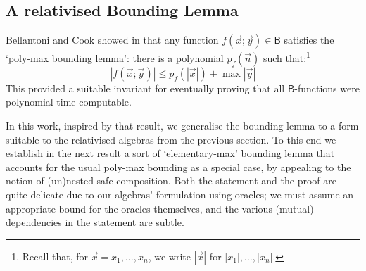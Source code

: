 \documentclass[manuscript,screen]{acmart}
\theoremstyle{definition}
\theoremstyle{remark}
\newcommand{\bc}{\mathsf{B}}
\begin{document}
\subsection{A relativised Bounding Lemma}
\label{sec:bounding-lemma}
Bellantoni and Cook showed in \cite{BellantoniCook} that any function $f(\vec x;\vec y) \in \bc$ satisfies the `poly-max bounding lemma': there is a polynomial $p_f(\vec n)$ such that:\footnote{Recall that, for $\vec x = x_1, \dots, x_n$, we write $|\vec x|$ for $|x_1|, \dots, |x_n|$.}
\begin{equation}
    \label{eq:bc-polymax-eqn}
    |f(\vec x;\vec y)| \leq p_f (|\vec x|) + \max |\vec y| 
\end{equation}
This provided a suitable invariant for eventually proving that all $\bc$-functions were polynomial-time computable.

In this work, inspired by that result, we generalise the bounding lemma to a form suitable to the relativised algebras from the previous section. 
To this end we establish in the next result a sort of `elementary-max' bounding lemma that accounts for the usual poly-max bounding as a special case, by appealing to the notion of (un)nested safe composition.
Both the statement and the proof are quite delicate due to our algebras' formulation using oracles; we must assume an appropriate bound for the oracles themselves, and the various (mutual) dependencies in the statement are subtle.
\end{document}
